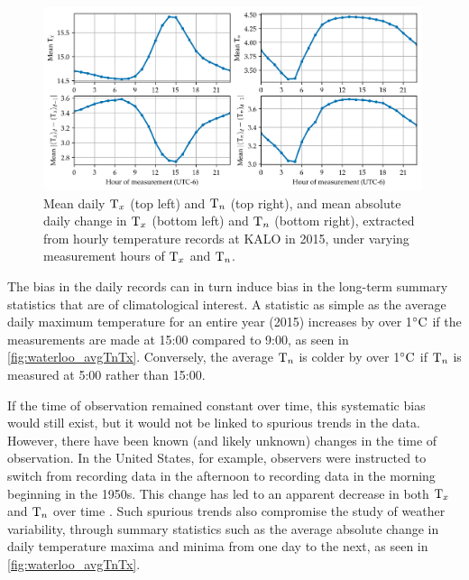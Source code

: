 \documentclass[12pt]{article}
\begin{document}
\begin{figure}[tbp]
\centering
\includegraphics[height=0.3\textheight,width=0.99\textwidth,keepaspectratio]{../figures/waterloo_bias_2x2.png}
\caption{
\label{fig:waterloo_avgTnTx}
Mean daily \(\mathrm{T}_{x}\) (top left) and \(\mathrm{T}_{n}\) (top right), and
mean absolute daily change in \(\mathrm{T}_{x}\) (bottom left) and \(\mathrm{T}_{n}\) (bottom right),
extracted from hourly temperature records at KALO in 2015,
under varying measurement hours of \(\mathrm{T}_{x}\) and \(\mathrm{T}_{n}\).}
\end{figure}

The bias in the daily records can in turn induce bias in the long-term summary statistics that are of climatological interest.
A statistic as simple as the average daily maximum temperature for an entire year (2015) increases by over 1\({}^{\circ}\mathrm{C}\) if the measurements are made at 15:00 compared to 9:00, as seen in \autoref{fig:waterloo_avgTnTx}.
Conversely, the average \(\mathrm{T}_{n}\) is colder by over 1\({}^{\circ}\mathrm{C}\) if \(\mathrm{T}_{n}\) is measured at 5:00 rather than 15:00.

If the time of observation remained constant over time, this systematic bias would still exist, but it would not be linked to spurious trends in the data. However, there have been known (and likely unknown) changes in the time of observation.
In the United States, for example, observers were instructed to switch from recording data in the afternoon to recording data in the morning beginning in the 1950s.
This change has led to an apparent decrease in both \(\mathrm{T}_{x}\) and \(\mathrm{T}_{n}\) over time \citep{menne2009us}. 
Such spurious trends also compromise the study of weather variability, through summary statistics such as the average absolute change in daily temperature maxima and minima from one day to the next, as seen in \autoref{fig:waterloo_avgTnTx}.

\end{document}
